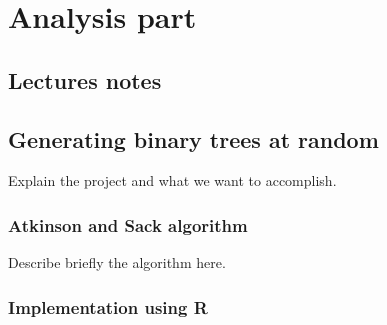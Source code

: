 \documentclass[twoside,openright,titlepage,fleqn,
	headinclude,11pt,a4paper,BCOR5mm,footinclude
	]{scrbook}
\begin{document}
\frenchspacing
\raggedbottom
{}
\pagestyle{plain}

\pagestyle{scrheadings}

\lstset{
	language = R
	, numbers = left 
	, basicstyle=\sffamily%
	, tabsize=2
	, captionpos=b
	, breaklines=true
	, showspaces=false
	, showstringspaces=false
}

\tableofcontents

\newpage



\part{Analysis part}

\chapter{Lectures notes}





\chapter{Generating binary trees at random}
Explain the project and what we want to accomplish.

\section{Atkinson and Sack algorithm}
Describe briefly the algorithm here.

\section{Implementation using R}
\end{document}
